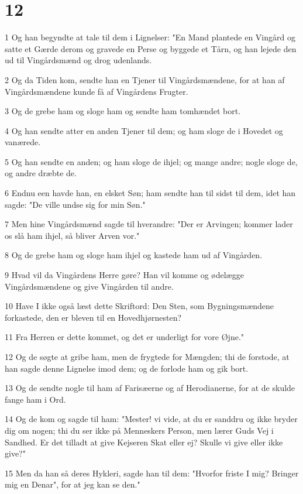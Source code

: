 \chapter{12}

\par 1 Og han begyndte at tale til dem i Lignelser: "En Mand plantede en Vingård og satte et Gærde derom og gravede en Perse og byggede et Tårn, og han lejede den ud til Vingårdsmænd og drog udenlands.
\par 2 Og da Tiden kom, sendte han en Tjener til Vingårdsmændene, for at han af Vingårdsmændene kunde få af Vingårdens Frugter.
\par 3 Og de grebe ham og sloge ham og sendte ham tomhændet bort.
\par 4 Og han sendte atter en anden Tjener til dem; og ham sloge de i Hovedet og vanærede.
\par 5 Og han sendte en anden; og ham sloge de ihjel; og mange andre; nogle sloge de, og andre dræbte de.
\par 6 Endnu een havde han, en elsket Søn; ham sendte han til sidst til dem, idet han sagde: "De ville undse sig for min Søn."
\par 7 Men hine Vingårdsmænd sagde til hverandre: "Der er Arvingen; kommer lader os slå ham ihjel, så bliver Arven vor."
\par 8 Og de grebe ham og sloge ham ihjel og kastede ham ud af Vingården.
\par 9 Hvad vil da Vingårdens Herre gøre? Han vil komme og ødelægge Vingårdsmændene og give Vingården til andre.
\par 10 Have I ikke også læst dette Skriftord: Den Sten, som Bygningsmændene forkastede, den er bleven til en Hovedhjørnesten?
\par 11 Fra Herren er dette kommet, og det er underligt for vore Øjne."
\par 12 Og de søgte at gribe ham, men de frygtede for Mængden; thi de forstode, at han sagde denne Lignelse imod dem; og de forlode ham og gik bort.
\par 13 Og de sendte nogle til ham af Farisæerne og af Herodianerne, for at de skulde fange ham i Ord.
\par 14 Og de kom og sagde til ham: "Mester! vi vide, at du er sanddru og ikke bryder dig om nogen; thi du ser ikke på Menneskers Person, men lærer Guds Vej i Sandhed. Er det tilladt at give Kejseren Skat eller ej? Skulle vi give eller ikke give?"
\par 15 Men da han så deres Hykleri, sagde han til dem: "Hvorfor friste I mig? Bringer mig en Denar", for at jeg kan se den."
